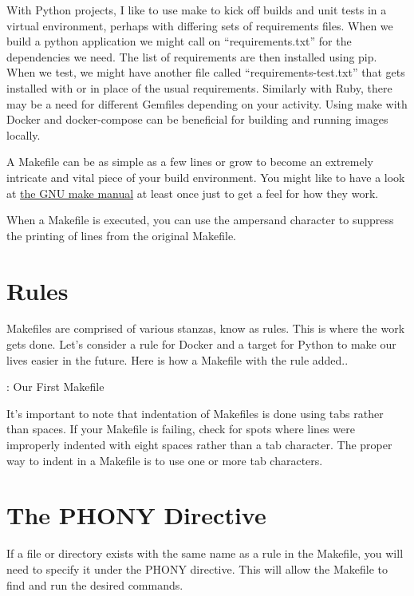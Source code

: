 \justifying
With Python projects, I like to use make to kick off builds and unit tests in a virtual environment, perhaps with differing sets of requirements files. When we build a
python application we might call on ``requirements.txt'' for the dependencies we need. The list of requirements are then installed using pip. When we test, we might have
another file called ``requirements-test.txt'' that gets installed with or in place of the usual requirements. Similarly with Ruby, there may be a need for different Gemfiles
depending on your activity. Using make with Docker and docker-compose can be beneficial for building and running images locally.

\justifying
A Makefile can be as simple as a few lines or grow to become an extremely intricate and vital piece of your
build environment. You might like to have a look at
\href{https://www.gnu.org/software/make/manual/make.html#Introduction}{the GNU make manual} at least once just to get a feel for how they work.

\justifying
When a Makefile is executed, you can use the ampersand character to suppress the printing of lines from the original Makefile.

\section{Rules}

\justifying
Makefiles are comprised of various stanzas, know as rules. This is where the work gets done. Let's consider a rule
for Docker and a target for Python to make our lives easier in the future. Here is how a Makefile with the rule added..

\justifying
\begin{mybox}{\thetcbcounter: Our First Makefile}
	
\end{mybox}

\justifying
It's important to note that indentation of Makefiles is done using tabs rather than spaces. If your Makefile is failing, check for spots where lines were improperly
indented with eight spaces rather than a tab character. The proper way to indent in a Makefile is to use one or more tab characters.

\section{The PHONY Directive}

\justifying
If a file or directory exists with the same name as a rule in the Makefile, you will need to specify
it under the PHONY directive. This will allow the Makefile to find and run the desired commands.

